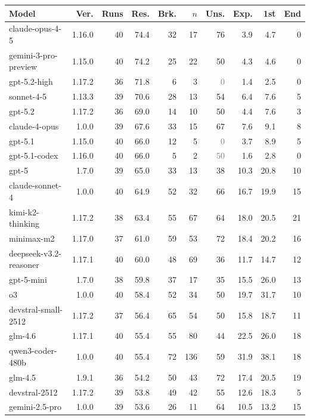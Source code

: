 {\scriptsize\setlength{\tabcolsep}{2pt}
\begin{tabular}{@{}lrrrrrrrrr@{}}
\toprule
Model & Ver. & Runs & Res. & Brk. & $n$ & Uns. & Exp. & 1st & End \\
\midrule
claude-opus-4-5 & 1.16.0 & 40 & 74.4 & 32 & 17 & 76 & 3.9 & 4.7 & 0 \\
gemini-3-pro-preview & 1.15.0 & 40 & 74.2 & 25 & 22 & 50 & 4.3 & 4.6 & 0 \\
gpt-5.2-high & 1.17.2 & 36 & 71.8 & 6 & 3 & \textcolor{gray}{0} & 1.4 & 2.5 & 0 \\
sonnet-4-5 & 1.13.3 & 39 & 70.6 & 28 & 13 & 54 & 6.4 & 7.6 & 5 \\
gpt-5.2 & 1.17.2 & 36 & 69.0 & 14 & 10 & 50 & 4.4 & 7.6 & 3 \\
claude-4-opus & 1.0.0 & 39 & 67.6 & 33 & 15 & 67 & 7.6 & 9.1 & 8 \\
gpt-5.1 & 1.15.0 & 40 & 66.0 & 12 & 5 & \textcolor{gray}{0} & 3.7 & 8.9 & 5 \\
gpt-5.1-codex & 1.16.0 & 40 & 66.0 & 5 & 2 & \textcolor{gray}{50} & 1.6 & 2.8 & 0 \\
gpt-5 & 1.7.0 & 39 & 65.0 & 33 & 13 & 38 & 10.3 & 20.8 & 10 \\
claude-sonnet-4 & 1.0.0 & 40 & 64.9 & 52 & 32 & 66 & 16.7 & 19.9 & 15 \\
kimi-k2-thinking & 1.17.2 & 38 & 63.4 & 55 & 67 & 64 & 18.0 & 20.5 & 21 \\
minimax-m2 & 1.17.0 & 37 & 61.0 & 59 & 53 & 72 & 18.4 & 20.2 & 16 \\
deepseek-v3.2-reasoner & 1.17.1 & 40 & 60.0 & 48 & 69 & 36 & 11.7 & 14.7 & 12 \\
gpt-5-mini & 1.7.0 & 38 & 59.8 & 37 & 17 & 35 & 15.5 & 26.0 & 13 \\
o3 & 1.0.0 & 40 & 58.4 & 52 & 34 & 50 & 19.7 & 31.7 & 10 \\
devstral-small-2512 & 1.17.2 & 37 & 56.4 & 65 & 54 & 50 & 15.8 & 18.7 & 11 \\
glm-4.6 & 1.17.1 & 40 & 55.4 & 55 & 80 & 44 & 22.5 & 26.0 & 18 \\
qwen3-coder-480b & 1.0.0 & 40 & 55.4 & 72 & 136 & 59 & 31.9 & 38.1 & 18 \\
glm-4.5 & 1.9.1 & 36 & 54.2 & 50 & 43 & 72 & 17.4 & 20.5 & 19 \\
devstral-2512 & 1.17.2 & 39 & 53.8 & 49 & 42 & 55 & 12.6 & 18.3 & 5 \\
gemini-2.5-pro & 1.0.0 & 39 & 53.6 & 26 & 11 & 64 & 10.5 & 13.2 & 15 \\

\end{tabular}}
